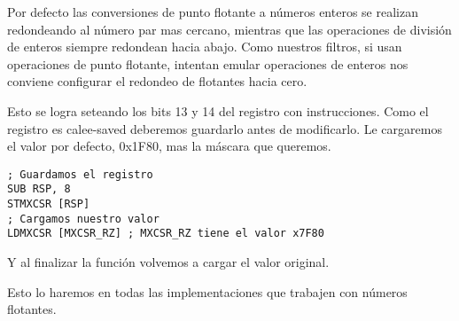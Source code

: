 Por defecto las conversiones de punto flotante a números enteros se realizan redondeando al número par mas cercano\textsuperscript{\cite[Volume 1, Chapter 10.2.3]{intelsys}}, mientras que las operaciones de división de enteros siempre redondean hacia abajo.
Como nuestros filtros, si usan operaciones de punto flotante, intentan emular operaciones de enteros nos conviene configurar el redondeo de flotantes hacia cero.

Esto se logra seteando los bits 13 y 14 del registro  con instrucciones.
Como el registro es calee-saved deberemos guardarlo antes de modificarlo.
Le cargaremos el valor por defecto, 0x1F80, mas la máscara que queremos.

\begin{lstlisting}
; Guardamos el registro
SUB RSP, 8
STMXCSR [RSP]
; Cargamos nuestro valor
LDMXCSR [MXCSR_RZ] ; MXCSR_RZ tiene el valor x7F80
\end{lstlisting}

Y al finalizar la función volvemos a cargar el valor original.

Esto lo haremos en todas las implementaciones que trabajen con números flotantes.

